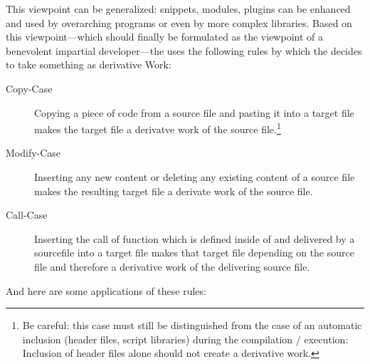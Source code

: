 {This viewpoint can be generalized: snippets, modules, plugins can be
enhanced and used by overarching programs or even by more complex libraries.
Based on this viewpoint---which should finally be formulated as the viewpoint of
a benevolent impartial developer---the \oslic{} uses the following rules by which
the \oslic{} decides to take something as derivative Work:
\label{sec:BenevolentDerivativeWorkUnderstanding}

\begin{description}
  \item[Copy-Case] Copying a piece of code from a source file and pasting it
  into a target file makes the target file a derivatve work of the source
  file.\footnote{Be careful: this case must still be distinguished from the case
  of an automatic inclusion (header files, script libraries) during the
  compilation / execution: Inclusion of header files alone should not create a derivative
  work.}
  \item[Modify-Case] Inserting any new content or deleting any existing content
  of a source file makes the resulting target file a derivate work of the
  source file.
  \item[Call-Case] Inserting the call of function which is defined inside of and 
  delivered by a sourcefile into a target file makes that target file
  depending on the source file and therefore a derivative work of the delivering
  source file.
\end{description}

And here are some applications of these rules:

}

